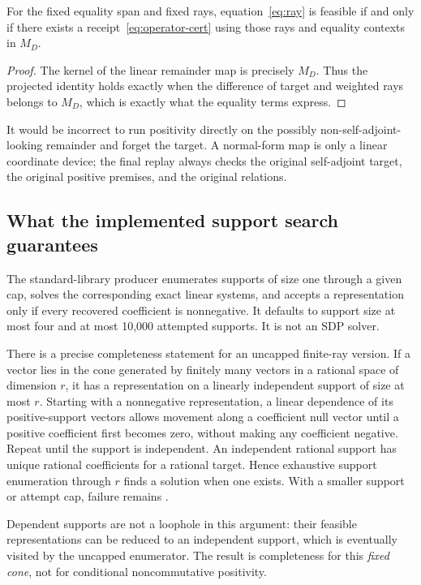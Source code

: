 \begin{proposition}
For the fixed equality span and fixed rays, equation~\eqref{eq:ray} is feasible
if and only if there exists a receipt~\eqref{eq:operator-cert} using those rays
and equality contexts in $M_D$.
\end{proposition}
\begin{proof}
The kernel of the linear remainder map is precisely $M_D$. Thus the projected
identity holds exactly when the difference of target and weighted rays belongs
to $M_D$, which is exactly what the equality terms express.
\end{proof}

It would be incorrect to run positivity directly on the possibly
non-self-adjoint-looking remainder and forget the target. A normal-form map is
only a linear coordinate device; the final replay always checks the original
self-adjoint target, the original positive premises, and the original relations.

\subsection{What the implemented support search guarantees}

The standard-library producer enumerates supports of size one through a given
cap, solves the corresponding exact linear systems, and accepts a representation
only if every recovered coefficient is nonnegative. It defaults to support
size at most four and at most 10,000 attempted supports. It is not an SDP solver.

There is a precise completeness statement for an uncapped finite-ray version.
If a vector lies in the cone generated by finitely many vectors in a rational
space of dimension $r$, it has a representation on a linearly independent
support of size at most $r$. Starting with a nonnegative representation, a
linear dependence of its positive-support vectors allows movement along a
coefficient null vector until a positive coefficient first becomes zero,
without making any coefficient negative. Repeat until the support is independent.
An independent rational support has unique rational coefficients for a rational
target. Hence exhaustive support enumeration through $r$ finds a solution when
one exists. With a smaller support or attempt cap, failure remains \unknown{}.

Dependent supports are not a loophole in this argument: their feasible
representations can be reduced to an independent support, which is eventually
visited by the uncapped enumerator. The result is completeness for this
\emph{fixed cone}, not for conditional noncommutative positivity.

